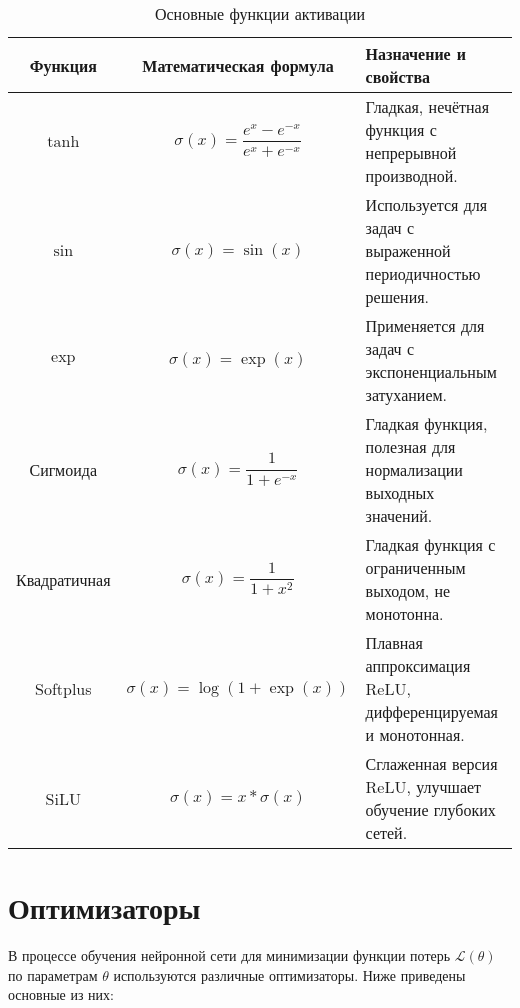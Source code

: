\begin{table}[h!]
    \centering
    \caption{Основные функции активации \cite{tensorflow2015-whitepaper}}
    \renewcommand{\arraystretch}{1.5}
    \begin{tabular}{|c|c|p{7cm}|}
    \hline
    \textbf{Функция} & \textbf{Математическая формула} & \textbf{Назначение и свойства} \\
    \hline
    $\tanh$ & $\sigma(x) = \dfrac{e^{x} - e^{-x}}{e^{x} + e^{-x}}$ & Гладкая, нечётная функция с непрерывной производной. \\
    \hline
    $\sin$ & $\sigma(x) = \sin(x)$ & Используется для задач с выраженной периодичностью решения. \\
    \hline
    $\exp$ & $\sigma(x) = \exp(x)$ & Применяется для задач с экспоненциальным затуханием. \\
    \hline
    Сигмоида & $\sigma(x) = \dfrac{1}{1 + e^{-x}}$ & Гладкая функция, полезная для нормализации выходных значений. \\
    \hline
    Квадратичная & $\sigma(x) = \dfrac{1}{1 + x^2}$ & Гладкая функция с ограниченным выходом, не монотонна. \\
    \hline
    Softplus & $\sigma(x) = \log(1 + \exp(x))$ & Плавная аппроксимация ReLU, дифференцируемая и монотонная. \\
    \hline
    SiLU & $\sigma(x) = x * \sigma(x)$ & Сглаженная версия ReLU, улучшает обучение глубоких сетей. \\
    \hline
    \end{tabular}
    \label{table:act_basic}
\end{table}

\section{Оптимизаторы}
В процессе обучения нейронной сети для минимизации функции потерь $\mathcal{L}(\theta)$ по параметрам $\theta$ используются различные оптимизаторы. Ниже приведены основные из них:

